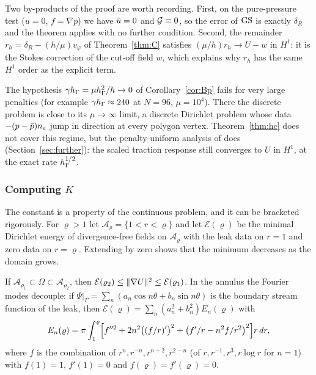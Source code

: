 Two by-products of the proof are worth recording. First, on the pure-pressure test ($u=0$, $f=\nabla p$) we have $\tilde u=0$ and $\mathcal G\equiv0$, so the error of $\mathrm{GS}$ is exactly $\delta_R$ and the theorem applies with no further condition. Second, the remainder $r_h=\delta_R-(h/\mu)v_\varphi$ of Theorem~\ref{thm:C} satisfies $(\mu/h)r_h\to U-w$ in $H^1$: it is the Stokes correction of the cut-off field $w$, which explains why $r_h$ has the same $H^1$ order as the explicit term.

\begin{remark}
The hypothesis $\gamma h_\Gamma=\mu h_\Gamma^2/h\to0$ of Corollary~\ref{cor:Bp} fails for very large penalties (for example $\gamma h_\Gamma\approx240$ at $N=96$, $\mu=10^4$). There the discrete problem is close to its $\mu\to\infty$ limit, a discrete Dirichlet problem whose data $-(p-\bar p)n_e$ jump in direction at every polygon vertex. Theorem~\ref{thm:hc} does not cover this regime, but the penalty-uniform analysis of \cite{PadhiExt} does (Section~\ref{sec:further}): the scaled traction response still converges to $U$ in $H^1$, at the exact rate $h_\Gamma^{1/2}$.
\end{remark}

\subsubsection*{Computing $K$}
The constant is a property of the continuous problem, and it can be bracketed rigorously. For $\varrho>1$ let $\mathcal A_\varrho=\{1<r<\varrho\}$ and let $\mathcal E(\varrho)$ be the minimal Dirichlet energy of divergence-free fields on $\mathcal A_\varrho$ with the leak data on $r=1$ and zero data on $r=\varrho$. Extending by zero shows that the minimum decreases as the domain grows.

\begin{proposition}\label{prop:bracket}
If $\mathcal A_{\varrho_1}\subset\Omega\subset\mathcal A_{\varrho_2}$, then $\mathcal E(\varrho_2)\le\lVert \nabla U\rVert^2\le\mathcal E(\varrho_1)$. In the annulus the Fourier modes decouple: if $\Psi|_\Gamma=\sum_n(a_n\cos n\theta+b_n\sin n\theta)$ is the boundary stream function of the leak, then $\mathcal E(\varrho)=\sum_n(a_n^2+b_n^2)E_n(\varrho)$ with
\[
E_n(\varrho)=\pi\int_1^\varrho\Bigl[f''^2+2n^2\bigl((f/r)'\bigr)^2+\bigl(f'/r-n^2f/r^2\bigr)^2\Bigr]r\,dr,
\]
where $f$ is the combination of $r^n,r^{-n},r^{n+2},r^{2-n}$ (of $r,r^{-1},r^3,r\log r$ for $n=1$) with $f(1)=1$, $f'(1)=0$ and $f(\varrho)=f'(\varrho)=0$.
\end{proposition}


